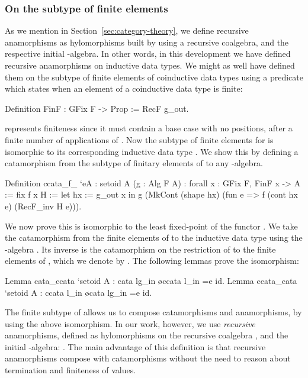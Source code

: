 \documentclass[a4paper,UKenglish,cleveref, autoref, thm-restate]{lipics-v2021}
\begin{document}
\subsubsection{On the subtype of finite elements}
As we mention in
Section~\ref{sec:category-theory}, we define recursive anamorphisms as
hylomorphisms built by using a recursive coalgebra, and the respective
initial -algebra.
In other words, in this development we have defined recursive anamorphisms on
inductive data types.  We might as well have defined them on the subtype of
finite elements of coinductive data types using a predicate which states when an
element of a coinductive data type is finite:
\begin{coqcode}
Definition FinF : GFix F -> Prop := RecF g_out.
\end{coqcode}
 represents finiteness since it must contain a base case with no
positions, after a finite number of applications of .
Now the subtype  of finite elements for 
is isomorphic to its corresponding inductive data type .
We show this by
defining a catamorphism  from the
subtype  of finitary elements of  to
any -algebra.
\begin{coqcode}
Definition ccata_f_ `{eA : setoid A} (g : Alg F A)
  : forall x : GFix F, FinF x -> A := fix f x H :=
    let hx := g_out x in
      g (MkCont (shape hx) (fun e => f (cont hx e) (RecF_inv H e))).
\end{coqcode}
We now prove this is isomorphic to the least fixed-point of the functor
.
We take the catamorphism from the finite elements of  to the
inductive data type  using the -algebra . Its
inverse is the catamorphism on the restriction of  to the finite
elements of , which we denote by .  The following lemmas
prove the isomorphism:
\begin{coqcode}
Lemma cata_ccata `{setoid A} : cata lg_in \o ccata l_in =e id.
Lemma ccata_cata `{setoid A} : ccata l_in \o cata lg_in =e id.
\end{coqcode}
The finite subtype of  allows us to compose
catamorphisms and anamorphisms, by using the above isomorphism. In our work,
however, we use \emph{recursive} anamorphisms, defined as hylomorphisms on the
 recursive coalgebra , and the initial -algebra:
.
The main advantage of this definition is that recursive anamorphisms compose
with catamorphisms without the need to reason about termination and finiteness
of values.
\end{document}

